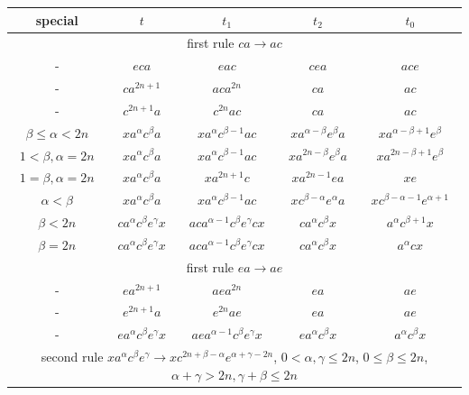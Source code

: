 \documentclass{article}
\theoremstyle{definition}
\begin{document}
\begin{center}
\begin{tabular}{|c|c|c|c|c|}
\hline
special & $t$ & $t_1$ & $t_2$ & $t_0$ \\
\hline
\hline
\multicolumn{5}{|c|}{first rule $ca \rightarrow ac$}\\
\hline
\hline
-& $ eca $ &  $  eac  $ &   $ cea  $ &  $ ace $ \\
\hline
-& $ ca^{2n+1} $ &  $  aca^{2n}  $ &   $ ca  $ &  $ ac $ \\
\hline
-& $ c^{2n+1} a $ &  $  c^{2n} a c $ &   $ ca  $ &  $ ac $ \\
\hline
$ \beta \le \alpha <2n$ & $ x a^\alpha c^\beta a  $ &  $  x a^\alpha c^{\beta-1} a c  $ &   $   x a^{\alpha - \beta} e^\beta a    $ &  $ x a^{\alpha-\beta+1} e^{\beta}  $ \\
\hline
$ 1<\beta, \alpha =2n$ & $ x a^\alpha c^\beta a  $ &  $  x a^\alpha c^{\beta-1} a c  $ &   $   x a^{2n - \beta} e^\beta a    $ &  $ x a^{2n-\beta+1} e^{\beta}  $ \\
\hline
$ 1=\beta, \alpha =2n$ & $ x a^\alpha c^\beta a  $ &  $  x a^{2n+1} c  $ &   $   x a^{2n - 1} e a    $ &  $ x e  $ \\
\hline
$\alpha < \beta$ & $ x a^\alpha c^\beta a  $ &  $  x a^\alpha c^{\beta-1} a c  $ &   $   x c^{\beta-\alpha} e^{\alpha} a    $ &  $ x c^{\beta-\alpha-1} e^{\alpha+1}     $ \\
\hline
$\beta<2n$ & $  c a^\alpha c^\beta e^\gamma x   $ &  $  a c a^{\alpha-1} c^\beta e^\gamma c x  $ &   $ c a^\alpha c^\beta x   $ &  $ a^\alpha c^{\beta+1} x  $ \\
\hline
$\beta = 2n$ & $  c a^\alpha c^\beta e^\gamma x   $ &  $  a c a^{\alpha-1} c^\beta e^\gamma c x  $ &   $ c a^\alpha c^\beta x   $ &  $ a^\alpha c x  $ \\
\hline
\hline
\multicolumn{5}{|c|}{first rule $ea \rightarrow ae$}\\
\hline
\hline
-& $ ea^{2n+1} $ &  $  aea^{2n}  $ &   $ ea  $ &  $ ae $ \\
\hline
-& $ e^{2n+1} a $ &  $  e^{2n} a e $ &   $ ea  $ &  $ ae $ \\
\hline
- & $  e a^\alpha c^\beta e^\gamma x   $ &  $  a e a^{\alpha-1} c^\beta e^\gamma x  $ &   $ e a^\alpha c^\beta x   $ &  $ a^\alpha c^{\beta} x  $ \\
\hline
\multicolumn{5}{|c|}{second rule $x a^\alpha c^\beta e^\gamma \rightarrow x c^{2n+\beta -\alpha} e^{\alpha+\gamma -2n}$,  $0< \alpha, \gamma \le 2n$, $0 \le \beta \le 2n$, $\alpha+\gamma > 2n, \gamma+\beta \le 2n$}\\

\end{tabular}
\end{center}
\end{document}
